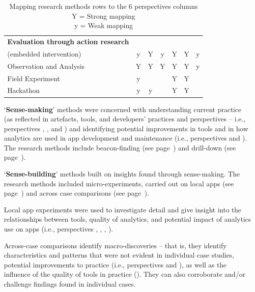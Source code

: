 \begin{table}
\begin{tabular}{l|ccc|ccc}
        \hline
        \textbf{Evaluation through action research} & & & & & & \\
        (embedded intervention)  &y &Y &y &Y &Y &y \\
        Observation and Analysis &Y &Y &Y &Y &Y &y \\
        Field Experiment         &y &  &  &Y &Y &  \\
        Hackathon                &y &y &  &Y &Y &  \\
        
        \bottomrule
    \end{tabular}
    \caption[Mapping research methods rows to the 6 perspectives columns]{Mapping research methods rows to the 6 perspectives columns \\ Y = Strong mapping \\ y = Weak mapping}
    \label{tab:mapping-analysis-to-six-perspectives}
\end{table}


`\textbf{Sense-making}' methods were concerned with understanding current practice (as reflected in artefacts, tools, and developers' practices and perspectives -- i.e., perspectives \uartefacts, \utools, and \uuse) and identifying potential improvements in tools and in how analytics are used in app development and maintenance (i.e., perspectives \itools and \iartefacts). The research methods include beacon-finding (see page~\pageref{section-beacon-finding-method}) and drill-down (see page~).


`\textbf{Sense-building}' methods built on insights found through sense-making. The research methods included micro-experiments, carried out on local apps (see page~\pageref{local-app-experiments-research-method}) and across case comparisons (see page~\pageref{across-case-comparisons-research-method}).

Local app experiments were used to investigate detail and give insight into the relationships between tools, quality of analytics, and potential impact of analytics use on apps (i.e., perspectives \uartefacts, \utools, \iartefacts, \itools).

Across-case comparisons identify macro-discoveries -- that is, they identify characteristics and patterns that were not evident in individual case studies, potential improvements to practice (i.e., perspectives \uuse and \iuse), as well as the influence of the quality of tools in practice (\itools). They can also corroborate and/or challenge findings found in individual cases.


